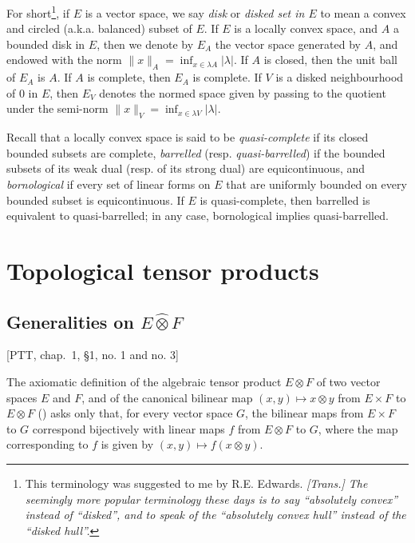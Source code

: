 \documentclass[british]{article}
\newcommand{\oldpage}[1]{\marginpar{\footnotesize$\Big\vert$ \textit{p.~#1}}}
\begin{document}
For short\footnote{This terminology was suggested to me by R.E. Edwards.
  \emph{{[}Trans.{]} The seemingly more popular terminology these days
  is to say ``absolutely convex'' instead of ``disked'', and to speak of
  the ``absolutely convex hull'' instead of the ``disked hull''.}}, if
\(E\) is a vector space, we say \emph{disk} or \emph{disked set in
\(E\)} to mean a convex and circled (a.k.a. balanced) subset of \(E\).
If \(E\) is a locally convex space, and \(A\) a bounded disk in \(E\),
then we denote by \(E_A\) the vector space generated by \(A\), and
endowed with the norm \(\|x\|_A=\inf_{x\in\lambda A}|\lambda|\). If
\(A\) is closed, then the unit ball of \(E_A\) is \(A\). If \(A\) is
complete, then \(E_A\) is complete. If \(V\) is a disked neighbourhood
of \(0\) in \(E\), then \(E_V\) denotes the normed space given by
passing to the quotient under the semi-norm
\(\|x\|_V=\inf_{x\in\lambda V}|\lambda|\).

Recall that a locally convex space is said to be \emph{quasi-complete}
if its closed bounded subsets are complete, \emph{barrelled} (resp.
\emph{quasi-barrelled}) if the bounded subsets of its weak dual (resp.
of its strong dual) are equicontinuous, and \emph{bornological} if every
set of linear forms on \(E\) that are uniformly bounded on every bounded
subset is equicontinuous. If \(E\) is quasi-complete, then barrelled is
equivalent to quasi-barrelled; in any case, bornological implies
quasi-barrelled.

\section{Topological tensor products}\label{section-1}

\subsection{\texorpdfstring{Generalities on
\(E\hat{\otimes}F\)}{Generalities on E\textbackslash hat\{\textbackslash otimes\}F}}\label{section-1.1}

{[}PTT, chap.~1, §1, no. 1 and no. 3{]}

\medskip
\oldpage{76}

The axiomatic definition of the algebraic tensor product \(E\otimes F\)
of two vector spaces \(E\) and \(F\), and of the canonical bilinear map
\((x,y)\mapsto x\otimes y\) from \(E\times F\) to \(E\otimes F\)
(\autocite{1}) asks only that, for every vector space \(G\), the
bilinear maps from \(E\times F\) to \(G\) correspond bijectively with
linear maps \(f\) from \(E\otimes F\) to \(G\), where the map
corresponding to \(f\) is given by \((x,y)\mapsto f(x\otimes y)\).
\end{document}

